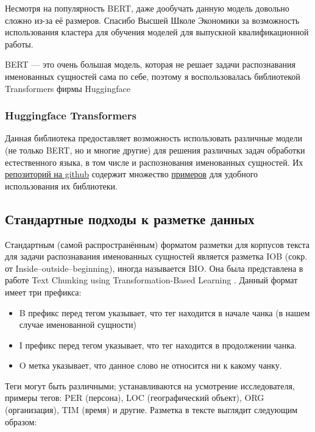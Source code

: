 Несмотря на популярность BERT, даже дообучать данную модель довольно сложно из-за её размеров. Спасибо Высшей Школе Экономики за возможность использования кластера для обучения моделей для выпускной квалификационной работы.

BERT --- это очень большая модель, которая не решает задачи распознавания именованных сущностей сама по себе, поэтому я воспользовалась библиотекой Transformers фирмы Huggingface \cite{Wolf2019HuggingFacesTS}

\subsubsection{Huggingface Transformers}

Данная библиотека предоставляет возможность использовать различные  модели (не только BERT, но и многие другие) для решения различных задач обработки естественного языка, в том числе и распознования именованных сущностей.
Их \href{https://github.com/huggingface/transformers}{репозиторий на github} содержит множество \href{https://github.com/huggingface/transformers/tree/master/examples/}{примеров} для удобного использования их библиотеки.


\subsection{Стандартные подходы к разметке данных}

Стандартным (самой распространённым) форматом разметки для корпусов текста для задачи распознавания именованных сущностей является разметка IOB (сокр. от Inside–outside–beginning), иногда называется BIO. Она была представлена в работе Text Chunking using Transformation-Based Learning \cite{DBLP:journals/corr/cmp-lg-9505040}. Данный формат имеет три префикса:
\begin{itemize}
\item B префикс перед тегом указывает, что тег находится в начале чанка (в нашем случае именованной сущности)
\item I префикс перед тегом указывает, что тег находится в продолжении чанка.
\item O метка указывает, что данное слово не относится ни к какому чанку. 
\end{itemize}
 
Теги могут быть различными; устанавливаются на усмотрение исследователя, примеры тегов: PER (персона), LOC (географический объект), ORG (организация), TIM (время) и другие. Разметка в тексте выглядит следующим образом:

